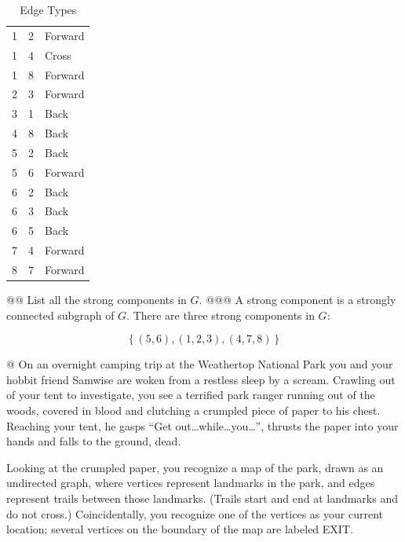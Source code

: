 \documentclass[10pt]{article}\usepackage[]{graphicx}\usepackage[]{xcolor}
\begin{document}
\begin{easylist}[enumerate]
    \begin{table}[H]
        \centering
        \begin{tabular}{|l|l|l|}
            \hline
            1 & 2 & Forward\\
            1 & 4 & Cross\\
            1 & 8 & Forward\\
            2 & 3 & Forward\\
            3 & 1 & Back\\
            4 & 8 & Back\\
            5 & 2 & Back\\
            5 & 6 & Forward\\
            6 & 2 & Back\\
            6 & 3 & Back\\
            6 & 5 & Back\\
            7 & 4 & Forward\\
            8 & 7 & Forward\\
            \hline
        \end{tabular}
        \caption{Edge Types}
        \label{table:edgetypes}
    \end{table}

    @@ List all the strong components in $G$.
    @@@ A strong component is a strongly connected subgraph of $G$. There are three strong components in $G$:

    \[
        \left\{ (5,6), (1,2,3), (4,7,8) \right\}
    \]

    @ On an overnight camping trip at the Weathertop National Park you and your hobbit friend Samwise are woken from a
    restless sleep by a scream. Crawling out of your tent to investigate, you see a terrified park ranger running out of
    the woods, covered in blood and clutching a crumpled piece of paper to his chest. Reaching your tent, he gasps ``Get
    out\ldots while\ldots you\ldots'', thrusts the paper into your hands and falls to the ground, dead.

    Looking at the crumpled paper, you recognize a map of the park, drawn as an undirected graph, where vertices
    represent landmarks in the park, and edges represent trails between those landmarks. (Trails start and end at
    landmarks and do not cross.) Coincidentally, you recognize one of the vertices as your current location; several
    vertices on the boundary of the map are labeled EXIT.


\end{easylist}
\end{document}
